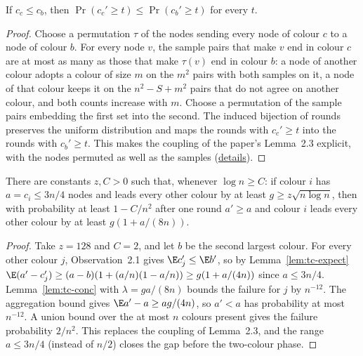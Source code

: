 \begin{lemma}\label{lem:tc-stochdom}
\leanok{}
If $c_c\le c_b$, then $\Pr(c_c'\ge t)\le\Pr(c_b'\ge t)$ for every $t$.
\end{lemma}
\begin{proof}\leanok
Choose a permutation $\tau$ of the nodes sending every node of colour $c$ to a node of colour $b$.
For every node $v$, the sample pairs that make $v$ end in colour $c$ are at most as many as those
that make $\tau(v)$ end in colour $b$: a node of another colour adopts a colour of size $m$ on the
$m^2$ pairs with both samples on it, a node of that colour keeps it on the $n^2-S+m^2$ pairs that
do not agree on another colour, and both counts increase with $m$. Choose a permutation of the
sample pairs embedding the first set into the second.
The induced bijection of rounds preserves the uniform distribution and maps the rounds with
$c_c'\ge t$ into the rounds with $c_b'\ge t$. This makes the coupling of the paper's Lemma~2.3
explicit, with the nodes permuted as well as the samples
(\href{https://github.com/formal-dynamics/leanamics/blob/main/median/FORMALIZATION_DIFFERENCES.md#remarks-on-the-sources}{details}).
\end{proof}

\begin{lemma}\label{lem:tc-growth-round}
\leanok{}
There are constants $z,C>0$ such that, whenever $\log n\ge C$: if colour $i$ has $a=c_i\le3n/4$
nodes and leads every other colour by at least $g\ge z\sqrt{n\log n}$, then with probability at
least $1-C/n^2$ after one round $a'\ge a$ and colour $i$ leads every other colour by at least
$g(1+a/(8n))$.
\end{lemma}
\begin{proof}\leanok
Take $z=128$ and $C=2$, and let $b$ be the second largest colour. For every other colour $j$,
Observation~2.1 gives $\E c_j'\le\E b'$, so by Lemma~\ref{lem:tc-expect}
$\E(a'-c_j')\ge(a-b)(1+(a/n)(1-a/n))\ge g(1+a/(4n))$ since $a\le3n/4$. Lemma~\ref{lem:tc-conc}
with $\lambda=ga/(8n)$ bounds the failure for $j$ by $n^{-12}$. The aggregation bound gives
$\E a'-a\ge ag/(4n)$, so $a'<a$ has probability at most $n^{-12}$. A union bound over the at most
$n$ colours present gives the failure probability $2/n^2$. This replaces the coupling of
Lemma~2.3, and the range $a\le3n/4$ (instead of $n/2$) closes the gap before the two-colour
phase.
\end{proof}

